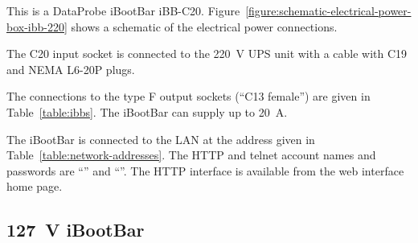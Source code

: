 This is a DataProbe iBootBar iBB-C20. Figure~\ref{figure:schematic-electrical-power-box-ibb-220} shows a schematic of the electrical power connections.

The C20 input socket is connected to the 220~V UPS unit with a cable with C19 and NEMA L6-20P plugs.

The connections to the type F output sockets (“C13 female”) are given in Table~\ref{table:ibbs}. The iBootBar can supply up to 20~A.

The iBootBar is connected to the LAN at the address given in Table~\ref{table:network-addresses}. The HTTP and telnet account names and passwords are “{\projectaccount}” and “{\projectaccount}”. The HTTP interface is available from the {\projectname} web interface home page.

\subsection{127~V iBootBar}

